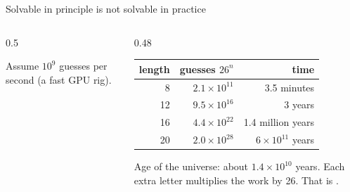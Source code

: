 
\begin{frame}{Solvable in principle is not solvable in practice}
\begin{columns}[T]
\begin{column}{0.5\textwidth}
\vspace{3mm}

{\small Assume $10^9$ guesses per second (a fast GPU rig).}
\end{column}
\begin{column}{0.48\textwidth}
\small
\begin{tabular}{@{}rrr@{}}
\toprule
length & guesses $26^n$ & time\\\midrule
8 & $2.1\times10^{11}$ & 3.5 minutes\\
12 & $9.5\times10^{16}$ & 3 years\\
16 & $4.4\times10^{22}$ & 1.4 million years\\
20 & $2.0\times10^{28}$ & $6\times10^{11}$ years\\\bottomrule
\end{tabular}
\vspace{2mm}

\footnotesize Age of the universe: about $1.4\times10^{10}$ years. Each extra letter multiplies the work by 26. That is .
\end{column}
\end{columns}
\end{frame}



